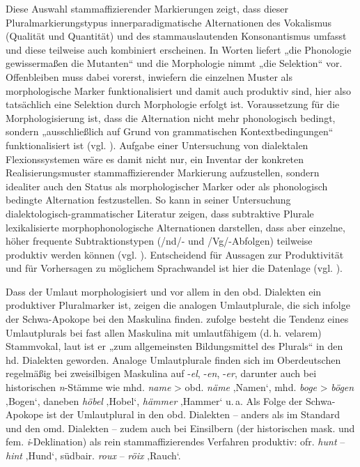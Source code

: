 \begin{sloppypar}
Diese Auswahl stammaffizierender Markierungen zeigt, dass dieser Pluralmarkierungstypus innerparadigmatische Alternationen des Vokalismus (Qualität und Quantität) und des stammauslautenden Konsonantismus umfasst und diese teilweise auch kombiniert erscheinen. In  Worten liefert „die Phonologie gewissermaßen die Mutanten“ und die Morphologie nimmt „die Selektion“ vor. Offenbleiben muss dabei vorerst, inwiefern die einzelnen Muster als morphologische Marker funktionalisiert und damit auch produktiv sind, hier also tatsächlich eine Selektion durch Morphologie erfolgt ist. Voraussetzung für die Morphologisierung ist, dass die Alternation nicht mehr phonologisch bedingt, sondern „ausschließlich auf Grund von grammatischen Kontextbedingungen“ \citep[57]{Wurzel1982} funktionalisiert ist (vgl. \citealt[195]{Seiler2008}). Aufgabe einer Untersuchung von dialektalen Flexionssystemen wäre es damit nicht nur, ein Inventar der konkreten Realisierungsmuster stammaffizierender Markierung aufzustellen, sondern idealiter auch den Status als morphologischer Marker oder als phonologisch bedingte Alternation festzustellen. So kann \citet{Birkenes2014} in seiner Untersuchung dialektologisch-grammatischer Literatur zeigen, dass subtraktive Plurale lexikalisierte morphophonologische Alternationen darstellen, dass aber einzelne, höher frequente Subtraktionstypen (/nd/- und /Vg/-Abfolgen) teilweise produktiv werden können (vgl. \citealt[94--96, 197--199]{Birkenes2014}). Entscheidend für Aussagen zur Produktivität und für Vorhersagen zu möglichem Sprachwandel ist hier die Datenlage (vgl. \citealt[208]{Birkenes2014}).
\end{sloppypar}

Dass der Umlaut morphologisiert und vor allem in den obd. Dialekten ein produktiver Pluralmarker ist, zeigen die analogen Umlautplurale, die sich infolge der Schwa-Apokope bei den Maskulina finden. \citet[418]{Schirmunski1962} zufolge besteht die Tendenz eines Umlautplurals bei fast allen Maskulina mit umlautfähigem (d.\,h. velarem) Stammvokal, laut \citet[1086]{Lüssy1983} ist er „zum allgemeinsten Bildungsmittel des Plurals“ in den hd. Dialekten geworden. Analoge Umlautplurale finden sich im Oberdeutschen regelmäßig bei zweisilbigen Maskulina auf -\textit{el}, -\textit{en}, {}-\textit{er}, darunter auch bei historischen \textit{n}{}-Stämme wie mhd. \textit{name} > obd. \textit{näme} ‚Namen‘, mhd. \textit{boge} > \textit{bögen} ‚Bogen‘, daneben \textit{höbel} ‚Hobel‘, \textit{hämmer} ‚Hammer‘ u.\,a. Als Folge der Schwa-Apokope ist der Umlautplural in den obd. Dialekten -- anders als im Standard und den omd. Dialekten -- zudem auch bei Einsilbern (der historischen mask. und fem. \textit{i}{}-Deklination) als rein stammaffizierendes Verfahren produktiv: ofr. \textit{hunt} -- \textit{hint} ‚Hund‘, südbair. \textit{roux} -- \textit{röix} ‚Rauch‘.\largerpage[2]

